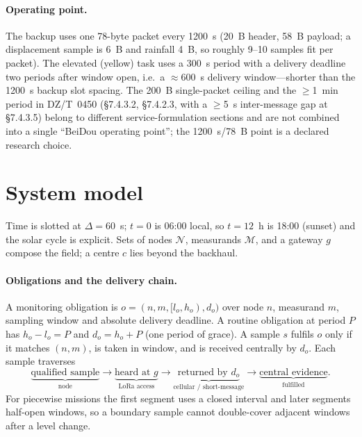\documentclass[11pt]{article}
\begin{document}
\paragraph{Operating point.}
The backup uses one 78-byte packet every 1200~s (20~B header, 58~B payload; a displacement sample is
6~B and rainfall 4~B, so roughly 9--10 samples fit per packet). The elevated (yellow) task uses a
300~s period with a delivery deadline two periods after window open, i.e.\ a $\approx$600~s delivery
window---shorter than the 1200~s backup slot spacing. The 200~B single-packet ceiling and the
$\geq$1~min period in DZ/T~0450 (\S7.4.3.2, \S7.4.2.3, with a $\geq$5~s inter-message gap at
\S7.4.3.5) belong to different service-formulation sections and are not combined into a single
``BeiDou operating point''; the 1200~s/78~B point is a declared research choice.

\section{System model}
\label{sec:model}

Time is slotted at $\Delta{=}60$~s; $t{=}0$ is 06:00 local, so $t{=}12$~h is 18:00 (sunset) and
the solar cycle is explicit. Sets of nodes $\mathcal N$, measurands $\mathcal M$, and a gateway $g$
compose the field; a centre $c$ lies beyond the backhaul.

\paragraph{Obligations and the delivery chain.}
A monitoring obligation is $o=(n,m,[l_o,h_o),d_o)$ over node $n$, measurand $m$, sampling window
and absolute delivery deadline. A routine obligation at period $P$ has $h_o-l_o=P$ and
$d_o=h_o+P$ (one period of grace). A sample $s$ fulfils $o$ only if it matches $(n,m)$, is taken in
window, and is received centrally by $d_o$. Each sample traverses
\[
\underbrace{\text{qualified sample}}_{\text{node}}
 \!\to\! \underbrace{\text{heard at }g}_{\text{LoRa access}}
 \!\to\! \underbrace{\text{returned by }d_o}_{\text{cellular / short-message}}
 \!\to\! \underbrace{\text{central evidence}}_{\text{fulfilled}} .
\]
For piecewise missions the first segment uses a closed interval and later segments half-open
windows, so a boundary sample cannot double-cover adjacent windows after a level change.
\end{document}
